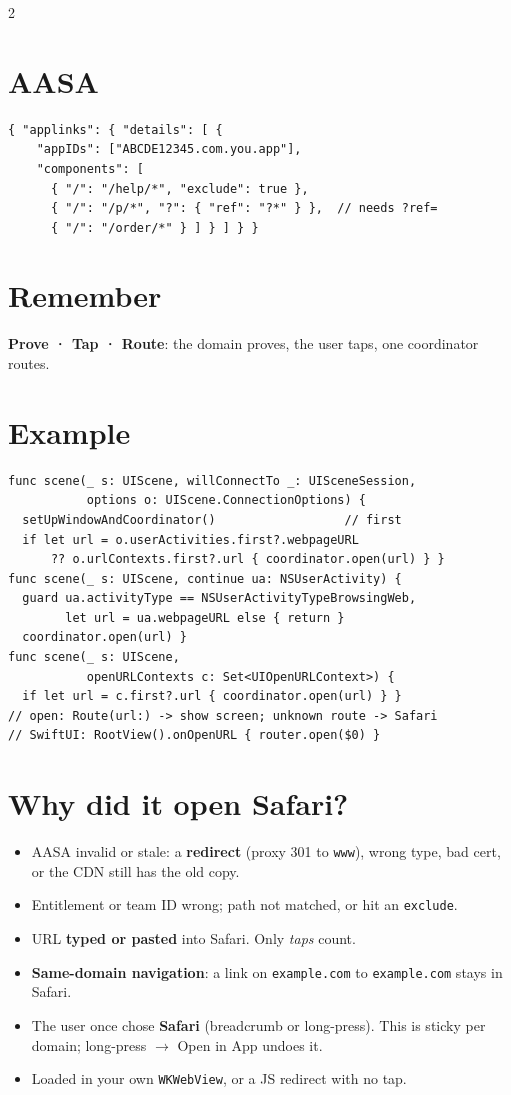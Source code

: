 \documentclass[8pt]{extarticle}
\begin{document}
\begin{multicols}{2}
\section{AASA}
\begin{lstlisting}
{ "applinks": { "details": [ {
    "appIDs": ["ABCDE12345.com.you.app"],
    "components": [
      { "/": "/help/*", "exclude": true },
      { "/": "/p/*", "?": { "ref": "?*" } },  // needs ?ref=
      { "/": "/order/*" } ] } ] } }
\end{lstlisting}

\section{Remember}
\textbf{Prove · Tap · Route}: the domain proves, the user taps, one coordinator routes.

\columnbreak

\section{Example}
\begin{lstlisting}[language=SwiftSheet]
func scene(_ s: UIScene, willConnectTo _: UISceneSession,
           options o: UIScene.ConnectionOptions) {
  setUpWindowAndCoordinator()                  // first
  if let url = o.userActivities.first?.webpageURL
      ?? o.urlContexts.first?.url { coordinator.open(url) } }
func scene(_ s: UIScene, continue ua: NSUserActivity) {
  guard ua.activityType == NSUserActivityTypeBrowsingWeb,
        let url = ua.webpageURL else { return }
  coordinator.open(url) }
func scene(_ s: UIScene,
           openURLContexts c: Set<UIOpenURLContext>) {
  if let url = c.first?.url { coordinator.open(url) } }
// open: Route(url:) -> show screen; unknown route -> Safari
// SwiftUI: RootView().onOpenURL { router.open($0) }
\end{lstlisting}

\section{Why did it open Safari?}
\begin{itemize}
  \item AASA invalid or stale: a \textbf{redirect} (proxy 301 to
        \texttt{www}), wrong type, bad cert, or the CDN still has the old copy.
  \item Entitlement or team ID wrong; path not matched, or hit an \texttt{exclude}.
  \item URL \textbf{typed or pasted} into Safari. Only \emph{taps} count.
  \item \textbf{Same-domain navigation}: a link on \texttt{example.com} to
        \texttt{example.com} stays in Safari.
  \item The user once chose \textbf{Safari} (breadcrumb or long-press). This
        is sticky per domain; long-press $\to$ Open in App undoes it.
  \item Loaded in your own \texttt{WKWebView}, or a JS redirect with no tap.
\end{itemize}


\end{multicols}
\end{document}
